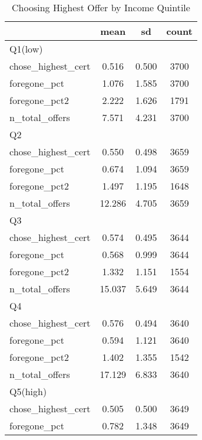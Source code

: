 \begin{table}[htbp]\centering
\def\sym#1{\ifmmode^{#1}\else\(^{#1}\)\fi}
\caption{Choosing Highest Offer by Income Quintile}
\begin{tabular}{l*{1}{ccc}}
\hline\hline
            &        mean&          sd&       count\\
\hline
Q1(low)     &            &            &            \\
chose\_highest\_cert&       0.516&       0.500&        3700\\
foregone\_pct&       1.076&       1.585&        3700\\
foregone\_pct2&       2.222&       1.626&        1791\\
n\_total\_offers&       7.571&       4.231&        3700\\
\hline
Q2          &            &            &            \\
chose\_highest\_cert&       0.550&       0.498&        3659\\
foregone\_pct&       0.674&       1.094&        3659\\
foregone\_pct2&       1.497&       1.195&        1648\\
n\_total\_offers&      12.286&       4.705&        3659\\
\hline
Q3          &            &            &            \\
chose\_highest\_cert&       0.574&       0.495&        3644\\
foregone\_pct&       0.568&       0.999&        3644\\
foregone\_pct2&       1.332&       1.151&        1554\\
n\_total\_offers&      15.037&       5.649&        3644\\
\hline
Q4          &            &            &            \\
chose\_highest\_cert&       0.576&       0.494&        3640\\
foregone\_pct&       0.594&       1.121&        3640\\
foregone\_pct2&       1.402&       1.355&        1542\\
n\_total\_offers&      17.129&       6.833&        3640\\
\hline
Q5(high)    &            &            &            \\
chose\_highest\_cert&       0.505&       0.500&        3649\\
foregone\_pct&       0.782&       1.348&        3649\\

\end{tabular}
\end{table}
